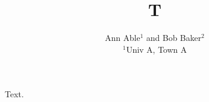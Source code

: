 \documentclass{article}
\title{T}
\author{Ann Able$^{1}$ and Bob Baker$^{2}$\\ $^{1}$Univ A, Town A}
\affil{$^2$Univ B, Town B}
\begin{document}
\maketitle
Text.
\end{document}
